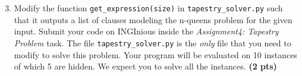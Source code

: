 \documentclass[11pt,a4paper]{report}
\begin{document}
\begin{answers}[10cm]
\end{answers}



\begin{enumerate}
\setcounter{enumi}{2}
\item Modify the function {\tt get\_expression(size)} in \texttt{tapestry\_solver.py} such that it outputs a list
of clauses modeling the n-queens problem for the given input. Submit your code on INGInious inside the \emph{Assignment4: Tapestry  Problem} task. The file \texttt{tapestry\_solver.py} is the \emph{only} file that you need to modify to solve this problem. Your program will be evaluated on 10 instances of which 5 are hidden. We expect you to solve all the instances. \textbf{(2 pts)}
\end{enumerate}

\begin{answers}[5cm]
\end{answers}
\end{document}
